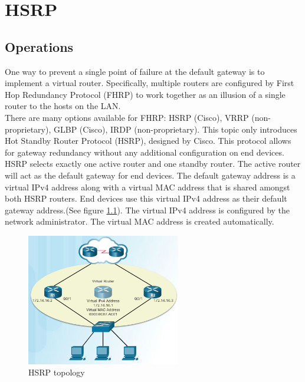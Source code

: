 \chapter{HSRP}

\section{Operations}

One way to prevent a single point of failure at the default gateway is to implement a virtual router. Specifically, multiple routers are configured by First Hop Redundancy Protocol (FHRP) to work together as an illusion of a single router to the hosts on the LAN. \\

There are many options available for FHRP: HSRP (Cisco), VRRP (non-proprietary), GLBP (Cisco), IRDP (non-proprietary). This topic only introduces Hot Standby Router Protocol (HSRP), designed by Cisco. This protocol allows for gateway redundancy without any additional configuration on end devices.\\
 
HSRP selects exactly one active router and one standby router. The active router will act as the default gateway for end devices. The default gateway address is a virtual IPv4 address along with a virtual MAC address that is shared amongst both HSRP routers. End devices use this virtual IPv4 address as their default gateway address.(See figure \ref{HSRP-topology}). The virtual IPv4 address is configured by the network administrator. The virtual MAC address is created automatically.

\begin{figure}[hbtp]
\centering
\includegraphics[width=0.6\textwidth]{pictures/HSRP.png}
\caption{HSRP topology}
\label{HSRP-topology}
\end{figure}

